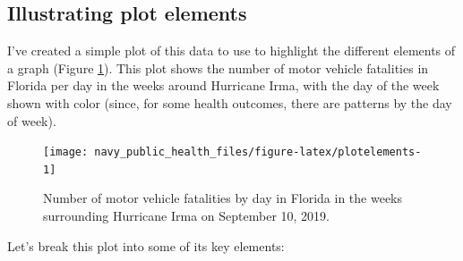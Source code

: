 \documentclass[]{tufte-book}
\begin{document}
\hypertarget{illustrating-plot-elements}{%
\subsection{Illustrating plot elements}\label{illustrating-plot-elements}}

I've created a simple plot of this data to use to highlight the different
elements of a graph (Figure \ref{fig:plotelements}). This plot shows the
number of motor vehicle fatalities
in Florida per day in the weeks around Hurricane Irma, with the day of the week shown
with color (since, for some health outcomes, there are patterns by the day
of week).

\begin{figure}
\texttt{[image: navy\_public\_health\_files/figure-latex/plotelements-1]} \caption[Number of motor vehicle fatalities by day in Florida in the weeks surrounding Hurricane Irma on September 10, 2019]{Number of motor vehicle fatalities by day in Florida in the weeks surrounding Hurricane Irma on September 10, 2019.}\label{fig:plotelements}
\end{figure}

Let's break this plot into some of its key elements:
\end{document}
